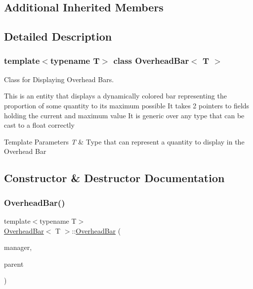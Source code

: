 \subsection*{Additional Inherited Members}


\subsection{Detailed Description}
\subsubsection*{template$<$typename T$>$\newline
class Overhead\+Bar$<$ T $>$}

Class for Displaying Overhead Bars. 

This is an entity that displays a dynamically colored bar representing the proportion of some quantity to its maximum possible It takes 2 pointers to fields holding the current and maximum value It is generic over any type that can be cast to a float correctly


\begin{DoxyTemplParams}{Template Parameters}
{\em T} & Type that can represent a quantity to display in the Overhead Bar \\
\hline
\end{DoxyTemplParams}


\subsection{Constructor \& Destructor Documentation}
\mbox{\label{class_overhead_bar_a62b70c8c2a6638cc4114a7454266d288}} 
\subsubsection{\texorpdfstring{OverheadBar()}{OverheadBar()}}
{\footnotesize\ttfamily template$<$typename T$>$ \\
\mbox{\hyperlink{class_overhead_bar}{Overhead\+Bar}}$<$ T $>$\+::\mbox{\hyperlink{class_overhead_bar}{Overhead\+Bar}} (\begin{DoxyParamCaption}\item[{\mbox{\hyperlink{class_game_manager}{Game\+Manager}} $\ast$}]{manager,  }\item[{\mbox{\hyperlink{class_game_entity}{Game\+Entity}} $\ast$}]{parent }\end{DoxyParamCaption})\hspace{0.3cm}{\ttfamily [inline]}}



